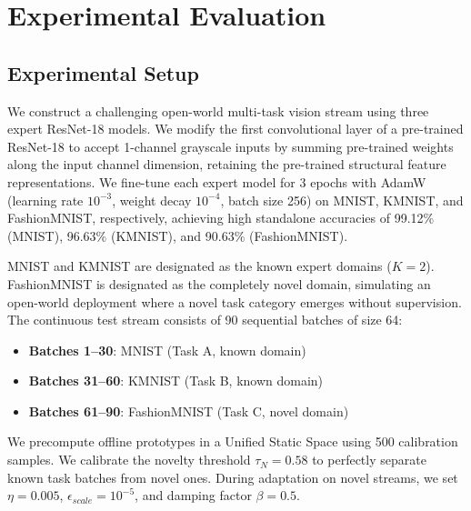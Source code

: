\documentclass{article}
\theoremstyle{plain}
\theoremstyle{definition}
\theoremstyle{remark}
\begin{document}
\section{Experimental Evaluation}
\label{experiments}

\subsection{Experimental Setup}
We construct a challenging open-world multi-task vision stream using three expert ResNet-18 models. We modify the first convolutional layer of a pre-trained ResNet-18 to accept 1-channel grayscale inputs by summing pre-trained weights along the input channel dimension, retaining the pre-trained structural feature representations. We fine-tune each expert model for 3 epochs with AdamW (learning rate $10^{-3}$, weight decay $10^{-4}$, batch size 256) on MNIST, KMNIST, and FashionMNIST, respectively, achieving high standalone accuracies of 99.12\% (MNIST), 96.63\% (KMNIST), and 90.63\% (FashionMNIST).

MNIST and KMNIST are designated as the known expert domains ($K=2$). FashionMNIST is designated as the completely novel domain, simulating an open-world deployment where a novel task category emerges without supervision. The continuous test stream consists of 90 sequential batches of size 64:
\begin{itemize}
    \item \textbf{Batches 1–30}: MNIST (Task A, known domain)
    \item \textbf{Batches 31–60}: KMNIST (Task B, known domain)
    \item \textbf{Batches 61–90}: FashionMNIST (Task C, novel domain)
\end{itemize}

We precompute offline prototypes in a Unified Static Space using 500 calibration samples. We calibrate the novelty threshold $\tau_N = 0.58$ to perfectly separate known task batches from novel ones. During adaptation on novel streams, we set $\eta = 0.005$, $\epsilon_{scale} = 10^{-5}$, and damping factor $\beta = 0.5$.
\end{document}
